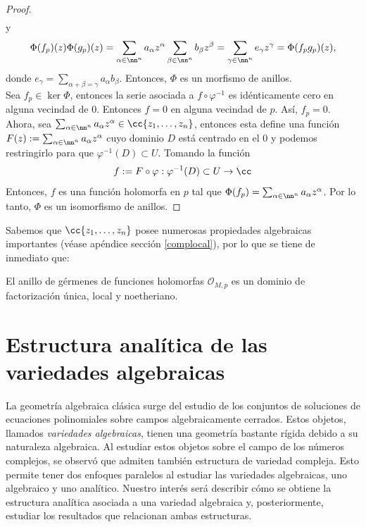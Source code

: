 \begin{proof}
\begin{align*}
        \end{align*}
        y
        \begin{equation*}
            \Phi(f_p)(z)\Phi(g_p)(z)=\sum_{\alpha\in\nn^n} a_\alpha z^{\alpha}\sum_{\beta\in\nn^n} b_\beta z^{\beta}=\sum_{\gamma\in\nn^n} e_\gamma z^{\gamma}=\Phi(f_pg_p)(z),
        \end{equation*}
        donde $e_\gamma=\sum_{\alpha+\beta=\gamma}a_\alpha b_\beta$. Entonces, $\Phi$ es un morfismo de anillos.\\
        Sea $f_p\in\ker\Phi$, entonces la serie asociada a $f\circ \varphi^{-1}$ es idénticamente cero en alguna vecindad de $0$. Entonces $f=0$ en alguna vecindad de $p$. Así, $f_p=0$.\\
        Ahora, sea $\sum_{\alpha\in\nn^n} a_\alpha z^\alpha \in\cc\{z_1,\dots,z_n\}$, entonces esta define una función $F(z):=\sum_{\alpha\in\nn^n} a_\alpha z^\alpha$ cuyo dominio $D$ está centrado en el $0$ y podemos restringirlo para que $\varphi^{-1}(D)\subset U$. Tomando la función
        \begin{equation*}
            f:=F\circ\varphi:\varphi^{-1}(D)\subset
             U\to \cc
        \end{equation*}
        Entonces, $f$ es una función holomorfa en $p$ tal que $\Phi(f_p)=\sum_{\alpha\in\nn^n} a_\alpha z^\alpha$. Por lo tanto, $\Phi$ es un isomorfismo de anillos.
    \end{proof}
    
     Sabemos que $\cc\{z_1,\dots, z_n\}$ posee numerosas propiedades algebraicas importantes (véase apéndice sección \ref{complocal}), por lo que se tiene de inmediato que:
     
    \begin{corollary}\label{dominiolocal}
        El anillo de gérmenes de funciones holomorfas $\mathscr{O}_{M,p}$ es un dominio de factorización única, local y noetheriano.
    \end{corollary}
	    
    \section{Estructura analítica de las variedades algebraicas}
    
    La geometría algebraica clásica surge del estudio de los conjuntos de soluciones de ecuaciones polinomiales sobre campos algebraicamente cerrados. Estos objetos, llamados \textit{variedades algebraicas}, tienen una geometría bastante rígida debido a su naturaleza algebraica. Al estudiar estos objetos sobre el campo de los números complejos, se observó que admiten también estructura de variedad compleja. Esto permite tener dos enfoques paralelos al estudiar las variedades algebraicas, uno algebraico y uno analítico. Nuestro interés será describir cómo se obtiene la estructura analítica asociada a una variedad algebraica y, posteriormente, estudiar los resultados que relacionan ambas estructuras.
    

